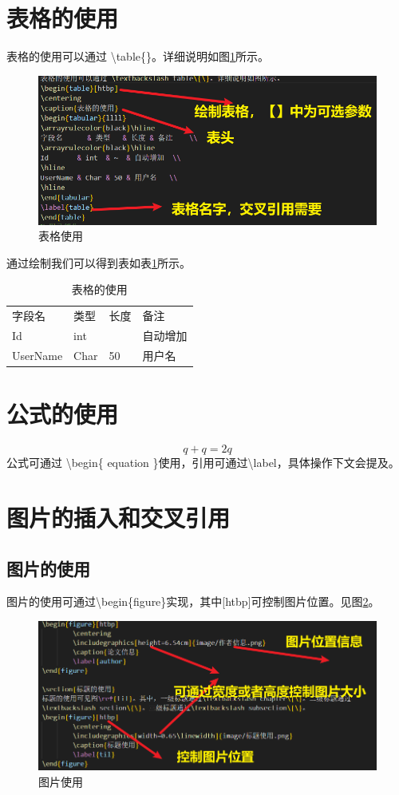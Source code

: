 ﻿\documentclass{scutthesis} %
\begin{document}
\section{表格的使用}
表格的使用可以通过 \textbackslash table\{\}。详细说明如图\ref{tablea}所示。
\begin{figure}[htbp]
        \centering
        \includegraphics[width=0.65\linewidth]{image/table.png}
        \caption{表格使用}
        \label{tablea}
\end{figure}

通过绘制我们可以得到表如表\ref{table}所示。
\begin{table}[htbp]
\centering
\caption{表格的使用}
\begin{tabular}{llll} 
\arrayrulecolor{black}\hline
字段名      & 类型   & 长度 & 备注    \\ 
\arrayrulecolor{black}\hline
Id       & int  & ~  & 自动增加  \\ 
\hline
UserName & Char & 50 & 用户名   \\
\hline
\end{tabular}
\label{table}
\end{table}

\section{公式的使用}
\begin{equation}
    q+q = 2q
    \label{gongshi}
\end{equation}
公式可通过 \textbackslash begin\{ equation \}使用，引用可通过\textbackslash label，具体操作下文会提及。

\section{图片的插入和交叉引用}
\subsection{图片的使用}
图片的使用可通过\textbackslash begin\{figure\}实现，其中[htbp]可控制图片位置。见图\ref{pic}。
\begin{figure}[htbp]
        \centering
        \includegraphics[width=0.65\linewidth]{image/figure.png}
        \caption{图片使用}
        \label{pic}
\end{figure}
\end{document}
